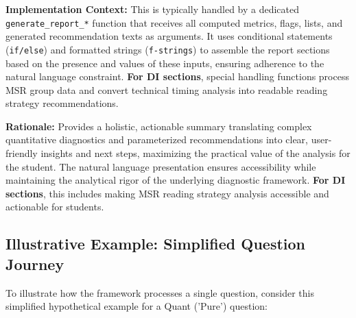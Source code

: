 \documentclass{article}
\begin{document}
\textbf{Implementation Context:} This is typically handled by a dedicated \texttt{generate\_report\_*} function that receives all computed metrics, flags, lists, and generated recommendation texts as arguments. It uses conditional statements (\texttt{if/else}) and formatted strings (\texttt{f-strings}) to assemble the report sections based on the presence and values of these inputs, ensuring adherence to the natural language constraint. \textbf{For DI sections}, special handling functions process MSR group data and convert technical timing analysis into readable reading strategy recommendations.

\textbf{Rationale:} Provides a holistic, actionable summary translating complex quantitative diagnostics and parameterized recommendations into clear, user-friendly insights and next steps, maximizing the practical value of the analysis for the student. The natural language presentation ensures accessibility while maintaining the analytical rigor of the underlying diagnostic framework. \textbf{For DI sections}, this includes making MSR reading strategy analysis accessible and actionable for students.

\subsection{Illustrative Example: Simplified Question Journey}

To illustrate how the framework processes a single question, consider this simplified hypothetical example for a Quant ('Pure') question:
\end{document}
